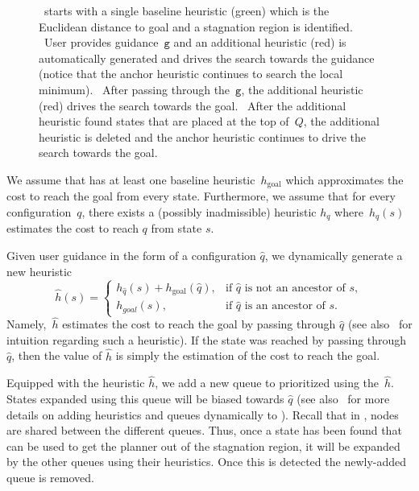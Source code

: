 \documentclass{article}
\begin{document}
\begin{figure}[t]
{    %
	~\mhastar starts with a single baseline heuristic (green) which is the Euclidean distance to goal and a stagnation region is identified.
	~User provides guidance~$\texttt{g}$ and an additional heuristic (red) is automatically generated and drives the search towards the guidance (notice that the anchor heuristic continues to search the local minimum).
	~After passing through the~$\texttt{g}$, the additional heuristic (red) drives the search towards the goal.
	~After the additional heuristic found states that are placed at the top of~$Q$, the additional heuristic is deleted and the anchor heuristic continues to drive the search towards the goal.
  }%
  \label{fig:filmstrip-dynamic_heuristic}%
  \vspace{-2.5mm}
\end{figure}



We assume that \mhastar has at least one baseline heuristic~$h_{\text{goal}}$ which approximates the cost to reach the goal from every state.
Furthermore, we assume that for every configuration~$q$, there exists a (possibly inadmissible) heuristic $h_q$ where~$h_q(s)$ estimates the cost to reach $q$ from state $s$.
%

Given user guidance in the form of a configuration $\hat{q}$, we dynamically generate a new heuristic $$
    \hat{h}(s)= 
\begin{cases}
    h_{\hat{q}}(s) + h_{\text{goal}}(\hat{q}),	& 
    		\text{if } \hat{q} \text{ is not an ancestor of } s,\\
    h_{{goal}}(s),            		& 
    		\text{if } \hat{q} \text{ is an ancestor of } s.
\end{cases}
$$
Namely,~$\hat{h}$ estimates the 
cost to reach the goal  by passing through $\hat{q}$ (see also~\cite{CGD86} for intuition regarding such a heuristic). 
If the state was reached by passing through~$\hat{q}$, then the value of $\hat{h}$ is simply the estimation of the cost to reach the goal.


Equipped with the heuristic $\hat{h}$, we add a new queue to \mhastar prioritized using the~$\hat{h}$. %
States expanded using this queue will be biased towards $\hat{q}$ (see also~\cite{INL15} for more details on adding heuristics and queues dynamically to \mhastar
).
Recall that in \mhastar, nodes are shared between the different queues.
Thus, once a state has been found that can be used to get the planner out of the stagnation region, it will be expanded by the other queues using their heuristics.
Once this is detected 
the newly-added queue is removed.
\end{document}
